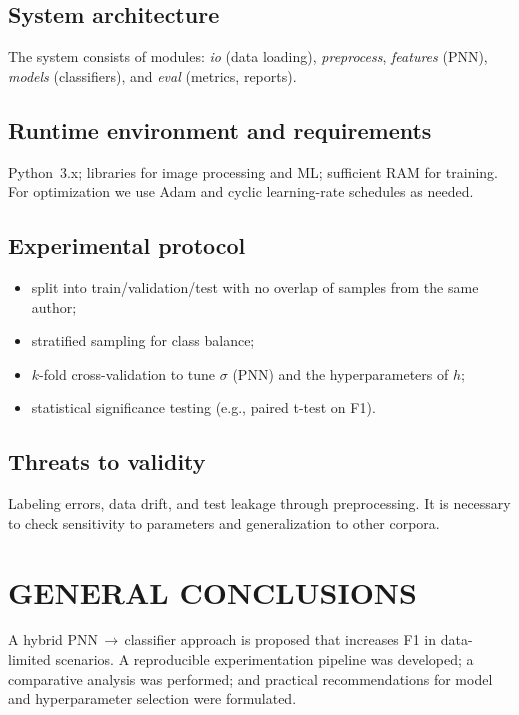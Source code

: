 \documentclass{article}
\begin{document}
\subsection{System architecture}
The system consists of modules: \textit{io} (data loading), \textit{preprocess},
\textit{features} (PNN), \textit{models} (classifiers), and \textit{eval} (metrics, reports).

\subsection{Runtime environment and requirements}
Python~3.x; libraries for image processing and ML; sufficient RAM for training.
For optimization we use Adam \cite{kingma2014adam} and cyclic learning-rate schedules as needed.

\subsection{Experimental protocol}
\begin{itemize}
  \item split into train/validation/test with no overlap of samples from the same author;
  \item stratified sampling for class balance;
  \item $k$-fold cross-validation to tune $\sigma$ (PNN) and the hyperparameters of $h$;
  \item statistical significance testing (e.g., paired t-test on F1).
\end{itemize}

\subsection{Threats to validity}
Labeling errors, data drift, and test leakage through preprocessing. It is necessary to
check sensitivity to parameters and generalization to other corpora.

\section*{GENERAL CONCLUSIONS}
A hybrid PNN\,$\to$\,classifier approach is proposed that increases F1 in data-limited scenarios.
A reproducible experimentation pipeline was developed; a comparative analysis was performed; and
practical recommendations for model and hyperparameter selection were formulated.
\end{document}
